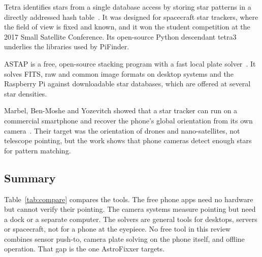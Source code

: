 Tetra identifies stars from a single database access by storing star patterns in a directly addressed hash table~\cite{tetra2017}. It was designed for spacecraft star trackers, where the field of view is fixed and known, and it won the student competition at the 2017 Small Satellite Conference. Its open-source Python descendant tetra3 underlies the libraries used by PiFinder.

ASTAP is a free, open-source stacking program with a fast local plate solver~\cite{astap}. It solves FITS, raw and common image formats on desktop systems and the Raspberry Pi against downloadable star databases, which are offered at several star densities.

Marbel, Ben-Moshe and Yozevitch showed that a star tracker can run on a commercial smartphone and recover the phone's global orientation from its own camera~\cite{marbel2020}. Their target was the orientation of drones and nano-satellites, not telescope pointing, but the work shows that phone cameras detect enough stars for pattern matching.

\subsection{Summary}

Table~\ref{tab:compare} compares the tools. The free phone apps need no hardware but cannot verify their pointing. The camera systems measure pointing but need a dock or a separate computer. The solvers are general tools for desktops, servers or spacecraft, not for a phone at the eyepiece. No free tool in this review combines sensor push-to, camera plate solving on the phone itself, and offline operation. That gap is the one AstroFixxer targets.

